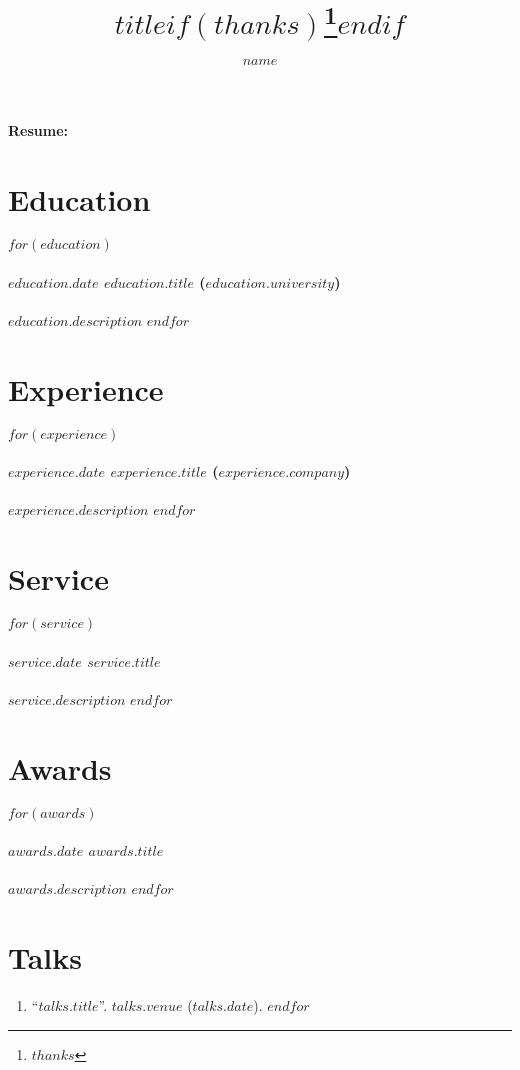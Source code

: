 \documentclass[10pt,twocolumn]{article}
\title{$title$$if(thanks)$\thanks{$thanks$}$endif$}
\author{$name$}
\date{}
\makeatletter
\renewcommand\maketitle{
    {\raggedright\begin{center}%
      {\Large\bfseries Resume: \@author}\\[3ex]
    \end{center}}
  }
\makeatother
\begin{document}
\maketitle
\thispagestyle{empty}

\section*{Education}
$for(education)$
\paragraph{$education.date$ $education.title$ ($education.university$)}
$education.description$
$endfor$

\section*{Experience}
$for(experience)$
\paragraph{$experience.date$ $experience.title$ ($experience.company$)}
$experience.description$
$endfor$

\section*{Service}
$for(service)$
\paragraph{$service.date$ $service.title$}
$service.description$
$endfor$

\section*{Awards}
$for(awards)$
\paragraph{$awards.date$ $awards.title$}
$awards.description$
$endfor$

\section*{Talks}
\begin{enumerate}
$for(talks)$
\item ``\href{$talks.link$}{$talks.title$}''. $talks.venue$ ($talks.date$).
$endfor$
\end{enumerate}
\end{document}
